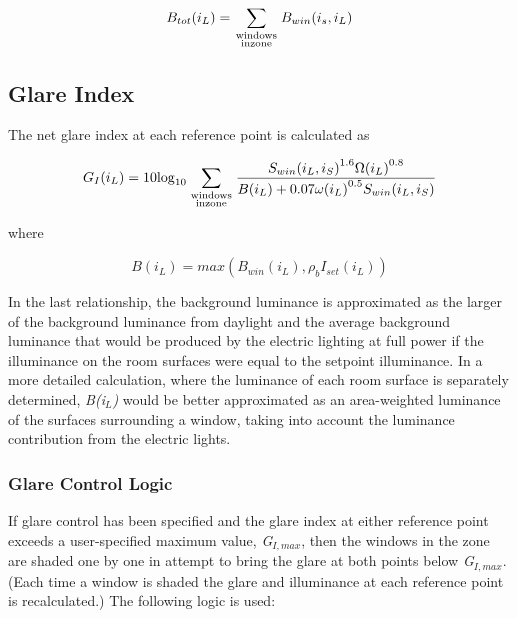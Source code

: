 \begin{equation}
{B_{tot}}({i_L}) = \sum\limits_{\scriptstyle{\rm{windows}}\atop\scriptstyle{\rm{in zone}}} {{B_{win}}({i_s},{i_L})}
\end{equation}

\subsection{Glare Index}\label{glare-index-000}

The net glare index at each reference point is calculated as

\begin{equation}
{G_I}({i_L}) = 10{\log_{10}}\sum\limits_{\scriptstyle{\rm{windows}}\atop\scriptstyle{\rm{in zone}}} {\frac{{{S_{win}}{{({i_L},{i_S})}^{1.6}}\Omega {{({i_L})}^{0.8}}}}{{B({i_L}) + 0.07\omega {{({i_L})}^{0.5}}{S_{win}}({i_L},{i_S})}}}
\end{equation}

where

\begin{equation}
B\left( {{i_L}} \right) = max\left( {{B_{win}}\left( {{i_L}} \right),{\rho_b}{I_{set}}\left( {{i_L}} \right)} \right)
\end{equation}

In the last relationship, the background luminance is approximated as the larger of the background luminance from daylight and the average background luminance that would be produced by the electric lighting at full power if the illuminance on the room surfaces were equal to the setpoint illuminance. In a more detailed calculation, where the luminance of each room surface is separately determined, \emph{B(i\(_{L}\))} would be better approximated as an area-weighted luminance of the surfaces surrounding a window, taking into account the luminance contribution from the electric lights.

\subsubsection{Glare Control Logic}\label{glare-control-logic}

If glare control has been specified and the glare index at either reference point exceeds a user-specified maximum value, \emph{G\(_{I,max}\)}, then the windows in the zone are shaded one by one in attempt to bring the glare at both points below \emph{G\(_{I,max}\)}. (Each time a window is shaded the glare and illuminance at each reference point is recalculated.) The following logic is used:

